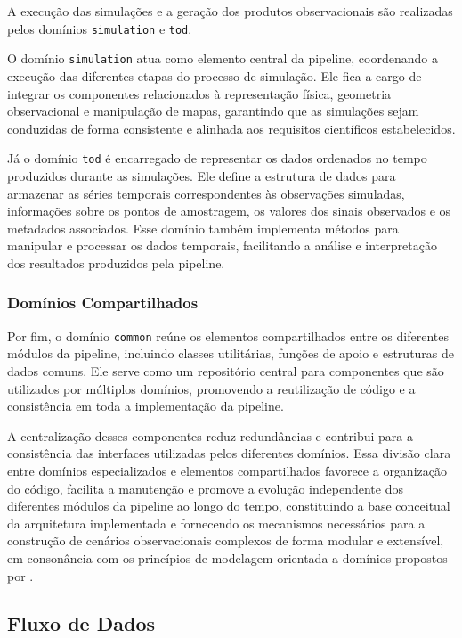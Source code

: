A execução das simulações e a geração dos produtos observacionais são realizadas pelos domínios \texttt{simulation} e \texttt{tod}.

O domínio \texttt{simulation} atua como elemento central da pipeline, coordenando a execução das diferentes etapas do processo de simulação. Ele fica a cargo de integrar os componentes relacionados à representação física, geometria observacional e manipulação de mapas, garantindo que as simulações sejam conduzidas de forma consistente e alinhada aos requisitos científicos estabelecidos.

Já o domínio \texttt{tod} é encarregado de representar os dados ordenados no tempo produzidos durante as simulações. Ele define a estrutura de dados para armazenar as séries temporais correspondentes às observações simuladas, informações sobre os pontos de amostragem, os valores dos sinais observados e os metadados associados. Esse domínio também implementa métodos para manipular e processar os dados temporais, facilitando a análise e interpretação dos resultados produzidos pela pipeline.

\subsubsection{Domínios Compartilhados}

Por fim, o domínio \texttt{common} reúne os elementos compartilhados entre os diferentes módulos da pipeline, incluindo classes utilitárias, funções de apoio e estruturas de dados comuns. Ele serve como um repositório central para componentes que são utilizados por múltiplos domínios, promovendo a reutilização de código e a consistência em toda a implementação da pipeline.

A centralização desses componentes reduz redundâncias e contribui para a consistência das interfaces utilizadas pelos diferentes domínios. Essa divisão clara entre domínios especializados e elementos compartilhados favorece a organização do código, facilita a manutenção e promove a evolução independente dos diferentes módulos da pipeline ao longo do tempo, constituindo a base conceitual da arquitetura implementada e fornecendo os mecanismos necessários para a construção de cenários observacionais complexos de forma modular e extensível, em consonância com os princípios de modelagem orientada a domínios propostos por .


\subsection{Fluxo de Dados}

